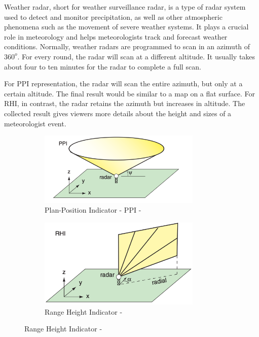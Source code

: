 Weather radar, short for weather surveillance radar, is a type of radar system
used to detect and monitor precipitation, as well as other atmospheric phenomena
such as the movement of severe weather systems. It plays a crucial role in
meteorology and helps meteorologists track and forecast weather conditions.
Normally, weather radars are programmed to scan in an azimuth of $360^o$. For
every round, the radar will scan at a different altitude. It usually takes about
four to ten minutes for the radar to complete a full scan.

For PPI representation, the radar will scan the entire azimuth, but only at a
certain altitude. The final result would be similar to a map on a flat surface.
For RHI, in contrast, the radar retains the azimuth but increases in altitude.
The collected result gives viewers more details about the height and sizes of a
meteorologist event.

\begin{figure}[H]
    \centering
    \begin{subfigure}{\textwidth}
        \centering
        \includegraphics[width=0.85\textwidth]{Images/2.1-ppi.png}
        \caption{Plan-Position Indicator - PPI - \cite{2022Weather}}
        \label{fig:ppi}
    \end{subfigure}

    \begin{subfigure}{\textwidth}
        \centering
        \includegraphics[width=0.85\textwidth]{Images/2.1-rhi.png}
        \caption{Range Height Indicator - \cite{2022Weather}}
        \label{fig:rhi}
    \end{subfigure}

\end{figure}




